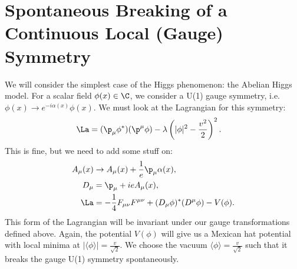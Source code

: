 \documentclass[a4paper, 11pt, normalem]{report}
\begin{document}
\section{Spontaneous Breaking of a Continuous Local (Gauge) Symmetry}
We will consider the simplest case of the Higgs phenomenon: the Abelian Higgs model.
For a scalar field $\phi(x)\in\C$, we consider a U(1) gauge symmetry, i.e. $\phi(x)\to e^{-i\alpha(x)}\phi(x)$.
We must look at the Lagrangian for this symmetry:
\begin{align}
    \La &= (\p_\mu\phi^*)(\p^\mu\phi) - \lambda\left(|\phi|^2-\frac{v^2}{2}\right)^2.
\end{align}
This is fine, but we need to add some stuff on:
\begin{align}
    A_\mu(x) &\to A_\mu(x) + \frac{1}{e}\p_\mu\alpha(x), \\
    D_\mu &= \p_\mu + ieA_\mu(x), \\
    \La &= -\frac14 F_{\mu\nu}F^{\mu\nu} + (D_\mu\phi)^*(D^\mu\phi)-V(\phi).
\end{align}
This form of the Lagrangian will be invariant under our gauge transformations defined above.
Again, the potential $V(\phi)$ will give us a Mexican hat potential with local minima at $|\langle\phi\rangle|=\frac{v}{\sqrt{2}}$.
We choose the vacuum $\langle\phi\rangle=\frac{v}{\sqrt{2}}$ such that it breaks the gauge U(1) symmetry spontaneously.
\end{document}
